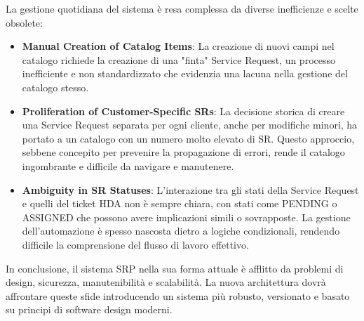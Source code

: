 La gestione quotidiana del sistema è resa complessa da diverse inefficienze e scelte obsolete:

\begin{itemize}
\item \textbf{Manual Creation of Catalog Items}: La creazione di nuovi campi nel catalogo richiede la creazione di una "finta" Service Request, un processo inefficiente e non standardizzato che evidenzia una lacuna nella gestione del catalogo stesso.
\item \textbf{Proliferation of Customer-Specific SRs}: La decisione storica di creare una Service Request separata per ogni cliente, anche per modifiche minori, ha portato a un catalogo con un numero molto elevato di SR. Questo approccio, sebbene concepito per prevenire la propagazione di errori, rende il catalogo ingombrante e difficile da navigare e manutenere.
\item \textbf{Ambiguity in SR Statuses}: L'interazione tra gli stati della Service Request e quelli del ticket HDA non è sempre chiara, con stati come PENDING o ASSIGNED che possono avere implicazioni simili o sovrapposte. La gestione dell'automazione è spesso nascosta dietro a logiche condizionali, rendendo difficile la comprensione del flusso di lavoro effettivo.
\end{itemize}

In conclusione, il sistema SRP nella sua forma attuale è afflitto da problemi di design, sicurezza, manutenibilità e scalabilità. La nuova architettura dovrà affrontare queste sfide introducendo un sistema più robusto, versionato e basato su principi di software design moderni.